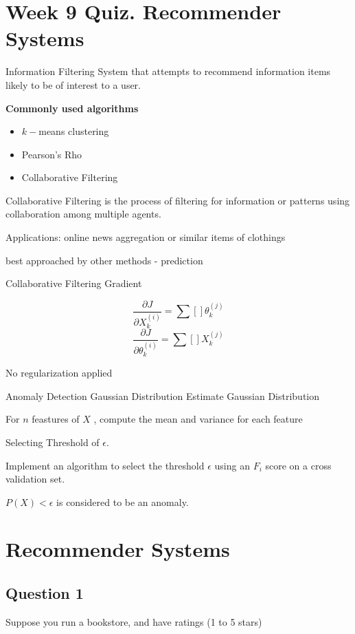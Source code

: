 \documentclass[11pt]{article} %
\begin{document}

\section{Week 9 Quiz. Recommender Systems}

Information Filtering System that attempts to recommend information items likely
to be of interest to a user.

\textbf{Commonly used algorithms}
\begin{itemize}
	\item $k-$means clustering
	\item Pearson's Rho
	\item Collaborative Filtering
\end{itemize}

Collaborative Filtering is the process of filtering for information or patterns using collaboration among multiple
agents.

Applications: online news aggregation or similar items of clothings

best approached by other methods - prediction

Collaborative Filtering Gradient

\[ \frac{\partial J}{\partial X^{(i)}_k}  = \sum [  ] \theta^{(j)}_k \]
\[ \frac{\partial J}{\partial \theta^{(i)}_k}  = \sum [  ] X^{(j)}_k \]

No regularization applied

Anomaly Detection
Gaussian Distribution
Estimate Gaussian Distribution

For $n$ feastures of $X$ , compute the mean and variance for each feature

Selecting Threshold of $\epsilon$.

Implement an algorithm to select the threshold $\epsilon$ using an $F_i$ score on a 
cross validation set.

$P(X) < \epsilon$ is considered to be an anomaly.




\section*{Recommender Systems}



\subsection*{Question 1 }  
Suppose you run a bookstore, and have ratings (1 to 5 stars)
\end{document}
